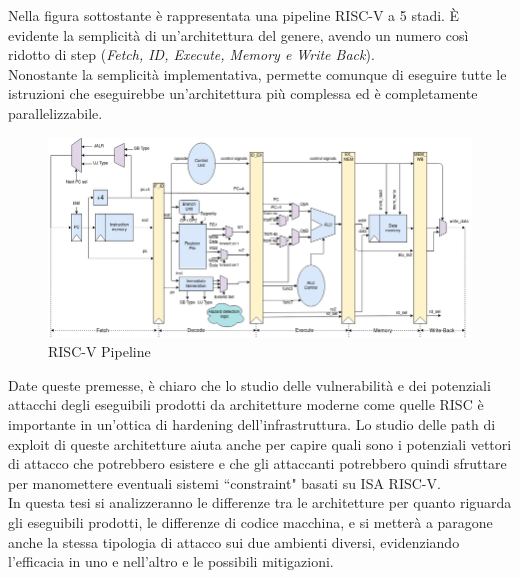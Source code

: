 Nella figura sottostante è rappresentata una pipeline RISC-V a 5 stadi. È evidente la semplicità di un'architettura del genere, avendo un numero così ridotto di step (\textit{Fetch, ID, Execute, Memory e Write Back}). \\
Nonostante la semplicità implementativa, permette comunque di eseguire tutte le istruzioni che eseguirebbe un'architettura più complessa ed è completamente parallelizzabile.
\vspace{1cm}
\FloatBarrier
\begin{figure}[!htbp] 
    \centering
    \includegraphics[width=1\linewidth]{images/risc-v-pipeline.png}
    \caption{RISC-V Pipeline}
\end{figure}
\vspace{1cm}
Date queste premesse, è chiaro che lo studio delle vulnerabilità e dei potenziali attacchi degli eseguibili prodotti da architetture moderne come quelle RISC è importante in un'ottica di hardening dell'infrastruttura. Lo studio delle path di exploit di queste architetture aiuta anche per capire quali sono i potenziali vettori di attacco che potrebbero esistere e che gli attaccanti potrebbero quindi sfruttare per manomettere eventuali sistemi ``constraint" basati su ISA RISC-V. \\
\newline
In questa tesi si analizzeranno le differenze tra le architetture per quanto riguarda gli eseguibili prodotti, le differenze di codice macchina, e si metterà a paragone anche la stessa tipologia di attacco sui due ambienti diversi, evidenziando l'efficacia in uno e nell'altro e le possibili mitigazioni.
